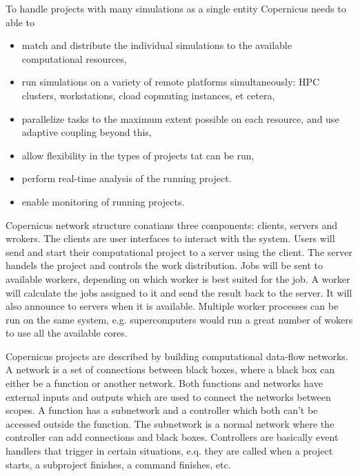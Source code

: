 To handle projects with many simulations as a single entity Copernicus
needs to able to
\renewcommand{\labelitemi}{-}
\begin{itemize} \slshape
\item match and distribute the individual simulations to the available
  computational resources,
\item run simulations on a variety of remote platforms simultaneously:
  HPC clusters, workstations, cload copmuting instances, et cetera,
\item parallelize tasks to the maximum extent possible on each
  resource, and use adaptive coupling beyond this,
\item allow flexibility in the types of projects tat can be run,
\item perform real-time analysis of the running project.
\item enable monitoring of running projects.\citep{pronk:2011}
\end{itemize}

Copernicus network structure conatians three components: clients,
servers and wrokers. The clients are user interfaces to interact with
the system. Users will send and start their computational project to a
server using the client. The server handels the project and controls
the work distribution. Jobs will be sent to available workers,
depending on which worker is best suited for the job. A worker will
calculate the jobs assigned to it and send the result back to the
server. It will also announce to servers when it is
available. Multiple worker processes can be run on the same system,
e.g. supercomputers would run a great number of wokers to use all the
available cores.

Copernicus projects are described by building computational data-flow
networks. A network is a set of connections between black boxes, where
a black box can either be a function or another network. Both
functions and networks have external inputs and outputs which are used
to connect the networks between scopes. A function has a subnetwork
and a controller which both can't be accessed outside the
function. The subnetwork is a normal network where the controller can
add connections and black boxes. Controllers are basically event
handlers that trigger in certain situations, e.q. they are called when
a project starts, a subproject finishes, a command finishes,
etc\citep{pronk:2011}.


